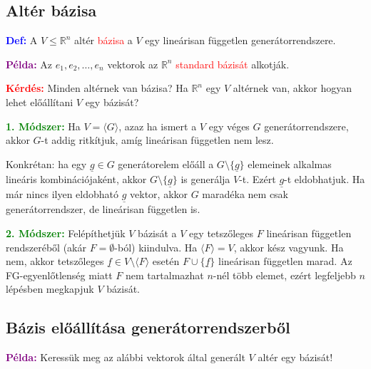 \documentclass[../szamtud.tex]{subfiles}
\begin{document}
    
    \subsection{Altér bázisa}

        \textcolor{blue}{\textbf{Def:}} A $V \leq \mathbb{R}^n$ altér \textcolor{red}{bázisa} a $V$ egy lineárisan független generátorrendszere. 

        \textcolor{purple}{\textbf{Példa:}} Az $e_1, e_2, \dots, e_n$ vektorok az $\mathbb{R}^n$ \textcolor{red}{standard bázisát} alkotják.

        \textcolor{red}{\textbf{Kérdés:}} Minden altérnek van bázisa? Ha $\mathbb{R}^n$ egy $V$ altérnek van, akkor hogyan lehet előállítani $V$ egy bázisát?

        

        \textcolor{green}{\textbf{1. Módszer:}} Ha $V = \langle G \rangle$, azaz ha ismert a $V$ egy véges $G$ generátorrendszere, akkor $G$-t addig ritkítjuk, amíg lineárisan független nem lesz. 

        Konkrétan: ha egy $\underline{g} \in G$ generátorelem előáll a $G \setminus \{\underline{g}\}$ elemeinek alkalmas lineáris kombinációjaként, akkor $G \setminus \{\underline{g}\}$ is generálja $V$-t. Ezért $\underline{g}$-t eldobhatjuk. Ha már nincs ilyen eldobható $\underline{g}$ vektor, akkor $G$ maradéka nem csak generátorrendszer, de lineárisan független is.

        \textcolor{green}{\textbf{2. Módszer:}} Felépíthetjük $V$ bázisát a $V$ egy tetszőleges $F$ lineárisan független rendszeréből (akár $F = \emptyset$-ból) kiindulva. Ha $\langle F \rangle = V$, akkor kész vagyunk. Ha nem, akkor tetszőleges $\underline{f} \in V \setminus \langle F \rangle$ esetén $F \cup \{\underline{f}\}$ lineárisan független marad. Az FG-egyenlőtlenség miatt $F$ nem tartalmazhat $n$-nél több elemet, ezért legfeljebb $n$ lépésben megkapjuk $V$ bázisát.

    \subsection{Bázis előállítása generátorrendszerből}

        \textcolor{purple}{\textbf{Példa:}} Keressük meg az alábbi vektorok által generált $V$ altér egy bázisát!
\end{document}
